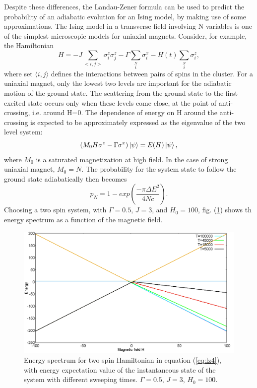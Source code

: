 \documentclass[../main.tex]{subfiles}
\begin{document}
Despite these differences, the Landau-Zener formula can be used to predict the probability of an adiabatic evolution for an Ising model, by making use of some approximations. The Ising model in a transverse field involving N variables is one of the simplest microscopic models for uniaxial magnets. Consider, for example, the Hamiltonian
\begin{equation}
H=-J \sum \limits_{<i,j>} \sigma_i^z \sigma_j^z - \Gamma \sum \limits_i \limits^N \sigma_i^x -H(t) \sum \limits_i \limits^N\sigma_i^z, \label{eq:lz4}
\end{equation} 
where set $\langle i,j \rangle$ defines the interactions between pairs of spins in the cluster. For a uniaxial magnet, only the lowest two levels are important for the adiabatic motion of the ground state. The scattering from the ground state to the first excited state occurs only when these levels come close, at the point of anti-crossing, i.e. around H=0. The dependence of energy on H around the anti-crossing is expected to be approximately expressed  as the eigenvalue of the two level system:
\begin{equation}
(M_0H\sigma^z-\Gamma \sigma^x)\ket{\psi}=E(H)\ket{\psi}, \label{eq:lz6}
\end{equation}
where $M_0$ is a saturated magnetization at high field. In the case of strong uniaxial magnet, $M_0=N$. The probability for the system state to follow the ground state adiabatically then becomes
\begin{equation}
p_N=1-exp(\frac{-\pi {\Delta E}^2}{4Nc}). \label{eq:lz5}
\end{equation}
Choosing a two spin system, with $\Gamma=0.5$, $J=3$, and $H_0=100$, fig. (\ref{fig:lz4}) shows th energy spectrum as a function of the magnetic field.
\begin{figure}[H]
\centering 
\includegraphics[scale=0.24]{EnergySpectrum_H100.png}
\caption{Energy spectrum for two spin Hamiltonian in equation (\ref{eq:lz4}), with energy expectation value of the instantaneous state of the system with different sweeping times. $\Gamma=0.5$, $J=3$, $H_0=100$.}
\label{fig:lz4}
\end{figure}
\end{document}

